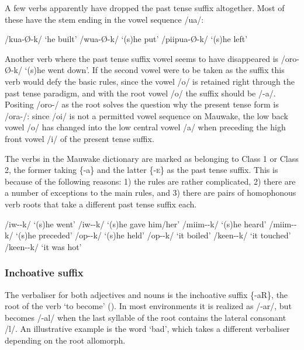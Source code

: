 A few verbs apparently have dropped the past tense suffix altogether.  Most of these have the stem ending in the vowel sequence /ua/:

\ea
\ea
/kua-{\O-k}/  `he built'
\ex
/wua-{\O-k}/  `(s)he put'
\ex
/piipua-{\O-k}/  `(s)he left'
\z
\z

Another verb where the past tense suffix vowel seems to have disappeared is /oro-{\O}-k/ `(s)he went down'.  If the second vowel were to be taken as the suffix this verb would defy the basic rules, since the vowel /o/ is retained right through the past tense paradigm, and with the root vowel /o/ the suffix should be /-a/.  Positing /oro-/ as the root solves the question why the present tense form is /ora-/: since /oi/ is not a permitted vowel sequence on Mauwake, the low back vowel /o/ has changed into the low central vowel /a/ when preceding the high front vowel /i/ of the present tense suffix.

The verbs in the Mauwake dictionary are marked as belonging to Class 1 or Class 2, the former taking \{-a\} and the latter \{-\textsc{e}\} as the past tense suffix. This is because of the following reasons: 1) the rules are rather complicated, 2) there are a number of exceptions to the main rules, and 3) there are pairs of homophonous verb roots that take a different past tense suffix each.

\ea
\ea
/iw--k/  `(s)he went'
\ex
/iw--k/  `(s)he gave him/her'
\ex
/miim--k/  `(s)he heard'
\ex
/miim--k/  `(s)he preceded'
\ex
/op--k/  `(s)he held'
\ex
/op--k/  `it boiled'
\ex
/keen--k/  `it touched'
\ex
/keen--k/  `it was hot'
\z
\z

\subsubsection{Inchoative suffix} \label{sec:2:z:y:x}

The verbaliser for both adjectives and nouns is the inchoative suffix \{-aR\}, the root of the verb `to become' ().  In most environments it is realized as /\nobreakdash-ar/, but becomes /-al/ when the last syllable of the root contains the lateral consonant /l/.  An illustrative example is the word  `bad', which takes a different verbaliser depending on the root allomorph.

